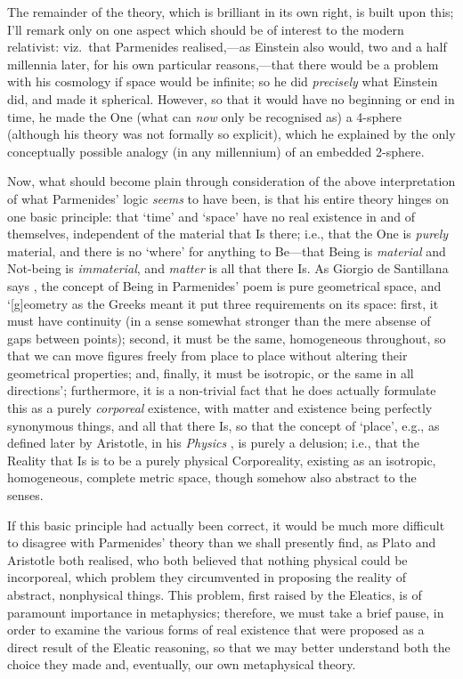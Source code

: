 The remainder of the theory, which is brilliant in its own right, is built upon this; I'll remark only on one aspect which should be of interest to the modern relativist: viz.~that Parmenides realised,---as Einstein also would, two and a half millennia later, for his own particular reasons,---that there would be a problem with his cosmology if space would be infinite; so he did \textit{precisely} what Einstein did, and made it spherical. However, so that it would have no beginning or end in time, he made the One (what can \textit{now} only be recognised as) a 4-sphere (although his theory was not formally so explicit), which he explained by the only conceptually possible analogy (in any millennium) of an embedded 2-sphere.

Now, what should become plain through consideration of the above interpretation of what Parmenides' logic \textit{seems} to have been, is that his entire theory hinges on one basic principle: that `time' and `space' have no real existence in and of themselves, independent of the material that Is there; i.e., that the One is \textit{purely} material, and there is no `where' for anything to Be---that Being is \textit{material} and Not-being is \textit{immaterial}, and \textit{matter} is all that there Is. As Giorgio de Santillana says \cite{deSantillana1961}, the concept of Being in Parmenides' poem is pure geometrical space, and `[g]eometry as the Greeks meant it put three requirements on its space: first, it must have continuity (in a sense somewhat stronger than the mere absense of gaps between points); second, it must be the same, homogeneous throughout, so that we can move figures freely from place to place without altering their geometrical properties; and, finally, it must be isotropic, or the same in all directions'; furthermore, it is a non-trivial fact that he does actually formulate this as a purely \textit{corporeal} existence, with matter and existence being perfectly synonymous things, and all that there Is, so that the concept of `place', e.g., as defined later by Aristotle, in his \textit{Physics} \cite{Aristotle1984}, is purely a delusion; i.e., that the Reality that Is is to be a purely physical Corporeality, existing as an isotropic, homogeneous, complete metric space, though somehow also abstract to the senses. 

If this basic principle had actually been correct, it would be much more difficult to disagree with Parmenides' theory than we shall presently find, as Plato and Aristotle both realised, who both believed that nothing physical could be incorporeal, which problem they circumvented in proposing the reality of abstract, nonphysical things. This problem, first raised by the Eleatics, is of paramount importance in metaphysics; therefore, we must take a brief pause, in order to examine the various forms of real existence that were proposed as a direct result of the Eleatic reasoning, so that we may better understand both the choice they made and, eventually, our own metaphysical theory.

